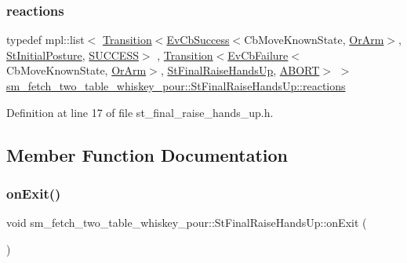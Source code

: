 \subsubsection{\texorpdfstring{reactions}{reactions}}
{\footnotesize\ttfamily typedef mpl\+::list$<$ \hyperlink{classsmacc_1_1Transition}{Transition}$<$\hyperlink{structsmacc_1_1EvCbSuccess}{Ev\+Cb\+Success}$<$Cb\+Move\+Known\+State, \hyperlink{classsm__fetch__two__table__whiskey__pour_1_1OrArm}{Or\+Arm}$>$, \hyperlink{structsm__fetch__two__table__whiskey__pour_1_1StInitialPosture}{St\+Initial\+Posture}, \hyperlink{structsmacc_1_1default__transition__tags_1_1SUCCESS}{S\+U\+C\+C\+E\+SS}$>$ , \hyperlink{classsmacc_1_1Transition}{Transition}$<$\hyperlink{structsmacc_1_1EvCbFailure}{Ev\+Cb\+Failure}$<$Cb\+Move\+Known\+State, \hyperlink{classsm__fetch__two__table__whiskey__pour_1_1OrArm}{Or\+Arm}$>$, \hyperlink{structsm__fetch__two__table__whiskey__pour_1_1StFinalRaiseHandsUp}{St\+Final\+Raise\+Hands\+Up}, \hyperlink{structsmacc_1_1default__transition__tags_1_1ABORT}{A\+B\+O\+RT}$>$ $>$ \hyperlink{structsm__fetch__two__table__whiskey__pour_1_1StFinalRaiseHandsUp_a9b8a865ecbb6cefbba4471fbd57df644}{sm\+\_\+fetch\+\_\+two\+\_\+table\+\_\+whiskey\+\_\+pour\+::\+St\+Final\+Raise\+Hands\+Up\+::reactions}}



Definition at line 17 of file st\+\_\+final\+\_\+raise\+\_\+hands\+\_\+up.\+h.



\subsection{Member Function Documentation}
\mbox{\label{structsm__fetch__two__table__whiskey__pour_1_1StFinalRaiseHandsUp_a3c767e0892a8e08c913243f75e9643b1}} 
\subsubsection{\texorpdfstring{on\+Exit()}{onExit()}}
{\footnotesize\ttfamily void sm\+\_\+fetch\+\_\+two\+\_\+table\+\_\+whiskey\+\_\+pour\+::\+St\+Final\+Raise\+Hands\+Up\+::on\+Exit (\begin{DoxyParamCaption}\item[{\hyperlink{structsmacc_1_1default__transition__tags_1_1ABORT}{A\+B\+O\+RT}}]{ }\end{DoxyParamCaption})\hspace{0.3cm}{\ttfamily [inline]}}



